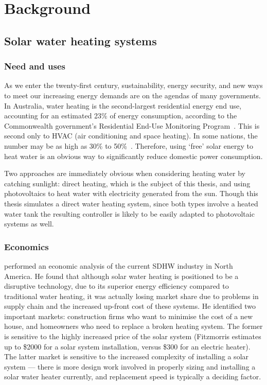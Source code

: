 \chapter{Background}
\label{ch:background}

\section{Solar water heating systems}

\subsection{Need and uses}

As we enter the twenty-first century, sustainability, energy security, and new ways to meet our increasing energy demands are on the agendas of many governments.
In Australia, water heating is the second-largest residential energy end use, accounting for an estimated 23\% of energy consumption, according to the Commonwealth government's Residential End-Use Monitoring Program~\cite{REMP12}.
This is second only to HVAC (air conditioning and space heating).
In some nations, the number may be as high as 30\% to 50\%~\cite{Lane96}.
Therefore, using `free' solar energy to heat water is an obvious way to significantly reduce domestic power consumption.

Two approaches are immediately obvious when considering heating water by catching sunlight: direct heating, which is the subject of this thesis, and using photovoltaics to heat water with electricity generated from the sun.
Though this thesis simulates a direct water heating system, since both types involve a heated water tank the resulting controller is likely to be easily adapted to photovoltaic systems as well.

\subsection{Economics}

\textcite{Fitzmorris10} performed an economic analysis of the current SDHW industry in North America.
He found that although solar water heating is positioned to be a disruptive technology, due to its superior energy efficiency compared to traditional water heating, it was actually losing market share due to problems in supply chain and the increased up-front cost of these systems.
He identified two important markets: construction firms who want to minimise the cost of a new house, and homeowners who need to replace a broken heating system.
The former is sensitive to the highly increased price of the solar system (Fitzmorris estimates up to \$2000 for a solar system installation, versus \$300 for an electric heater).
The latter market is sensitive to the increased complexity of installing a solar system --- there is more design work involved in properly sizing and installing a solar water heater currently, and replacement speed is typically a deciding factor.

